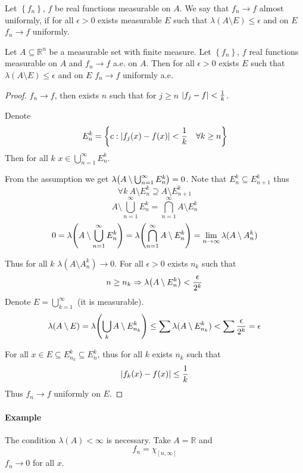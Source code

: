 \begin{definition}
Let $\left\{  f_n\right\}$, $f$ be real functions measurable on $A$. We say that $f_n\to f$ almost uniformly, if for all $\epsilon>0$ exists measurable $E$ such that $\lambda(A\setminus E) \leq \epsilon$ and on $E$ $f_n \to f$ uniformly.
\end{definition}
\begin{theorem}
	Let $A\subseteq \mathbb{R}^n$ be a measurable set with finite measure. Let $\left\{  f_n\right\}$, $f$ real functions measurable on $A$ and $f_n\to f$ a.e. on $A$. Then for all $\epsilon>0$ exists $E$ such that $\lambda(A\setminus E) \leq \epsilon$ and on $E$ $f_n \to f$ uniformly a.e.
	\begin{proof}
		$f_n\to f$, then exists $n$ such that for $j\geq n$ $\abs{f_j-f} < \frac{1}{k}$.
	
	Denote 
	$$E_n^k = \left\{ c: \abs{f_j(x) -f(x)} < \frac{1}{k} \quad \forall k\geq n \right\}  $$
	Then for all $k$ $x\in \bigcup_{n=1}^\infty E_n^k$.
	
	From the assumption we get $\lambda\qty(A\setminus \bigcup_{n=1}^\infty E_n^k)=0$. Note that $E_{n}^k \subseteq E_{n+1}^k$ thus
	$$\forall k \: A\setminus E_n^k \supseteq A\setminus E_{n+1}^k$$
	$$ A\setminus \bigcup_{n=1}^\infty E_n^k = \bigcap_{n=1}^\infty A\setminus E_{n}^k$$
	$$0=\lambda\qty(A\setminus \bigcup_{n=1}^\infty E_n^k) = \lambda\qty(\bigcap_{n=1}^\infty A\setminus E_{n}^k) = \lim_{n\to\infty} \lambda(A\setminus A_n^k)$$
	
	Thus for all $k$ $\lambda(A\setminus A_n^k) \to 0$. For all $\epsilon>0$ exists $n_k$ such that 
	$$n\geq n_k \Rightarrow \lambda\qty(A\setminus E_n^k) < \frac{\epsilon}{2^k}$$
	Denote $E = \bigcup_{k=1}^\infty$ (it is measurable). 
	$$\lambda(A\setminus E) = \lambda\qty(\bigcup_{k} A\setminus E_{n_k}^k) \leq \sum \lambda(A\setminus E_{n_k}^k) < \sum \frac{\epsilon}{2^k} = \epsilon$$
	
	For all $x\in E\subseteq E_{n_k}^k \subseteq E_n^k$, thus for all $k$ exists $n_k$ such that
	$$\abs{f_k(x) - f(x) } \leq \frac{1}{k}$$
	Thus $f_n \to f$ uniformly on $E$.
	\end{proof}
\end{theorem}

\paragraph{Example}
The condition $\lambda(A)<\infty$ is necessary. Take $A=\mathbb{R}$ and 
$$f_n = \chi_{[n,\infty]}$$
$f_n\to 0$ for all $x$.


